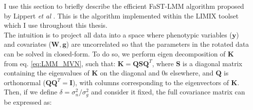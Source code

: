 




I use this section to  briefly describe the efficient FaST-LMM algorithm proposed by Lippert \textit{et al} \cite{lippert2011fast}.
This is the algorithm implemented within the LIMIX toolset \cite{lippert2014limix,casale2015efficient} which I use throughout this thesis.\\



The intuition is to project all data into a space where phenotypic variables ($\mathbf{y}$) and covariates ($\mathbf{W}, \mathbf{g}$) are uncorrelated so that the parameters in the rotated data can be solved in closed-form.
To do so, we perform eigen decomposition of $\mathbf{K}$ from eq. \eqref{eq:LMM_MVN}, such that: $\mathbf{K} = \mathbf{Q}\mathbf{S}\mathbf{Q}^T$, where $\mathbf{S}$ is a diagonal matrix containing the eigenvalues of $\mathbf{K}$ on the diagonal and 0s elsewhere, and $\mathbf{Q}$ is orthonormal ($\mathbf{Q}\mathbf{Q}^T = \mathbf{I}$), with columns corresponding to the eigenvectors of $\mathbf{K}$. 
Then, if we define $\delta = \sigma_n^2/\sigma_g^2$ and consider it fixed, the full covariance matrix can be expressed as:

